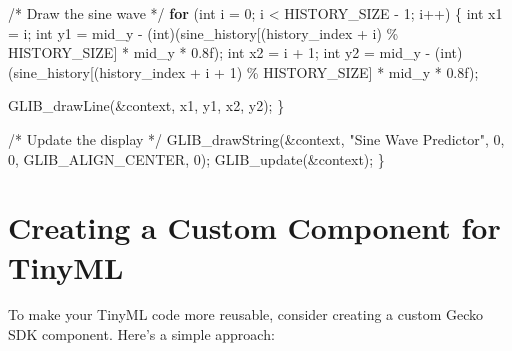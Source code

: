 \documentclass[
  9pt,
  letterpaper,
  abstract,
  titlepage]{scrbook}
\newenvironment{Shaded}{\begin{snugshade}}{\end{snugshade}}
\newcommand{\BuiltInTok}[1]{\textcolor[rgb]{0.00,0.23,0.31}{#1}}
\newcommand{\CommentTok}[1]{\textcolor[rgb]{0.37,0.37,0.37}{#1}}
\newcommand{\ControlFlowTok}[1]{\textcolor[rgb]{0.00,0.23,0.31}{\textbf{#1}}}
\newcommand{\DataTypeTok}[1]{\textcolor[rgb]{0.68,0.00,0.00}{#1}}
\newcommand{\DecValTok}[1]{\textcolor[rgb]{0.68,0.00,0.00}{#1}}
\newcommand{\FloatTok}[1]{\textcolor[rgb]{0.68,0.00,0.00}{#1}}
\newcommand{\NormalTok}[1]{\textcolor[rgb]{0.00,0.23,0.31}{#1}}
\newcommand{\OperatorTok}[1]{\textcolor[rgb]{0.37,0.37,0.37}{#1}}
\newcommand{\StringTok}[1]{\textcolor[rgb]{0.13,0.47,0.30}{#1}}
\begin{document}
\begin{Shaded}
\begin{Highlighting}[]
  \CommentTok{/* Draw the sine wave */}
  \ControlFlowTok{for} \OperatorTok{(}\DataTypeTok{int}\NormalTok{ i }\OperatorTok{=} \DecValTok{0}\OperatorTok{;}\NormalTok{ i }\OperatorTok{\textless{}}\NormalTok{ HISTORY\_SIZE }\OperatorTok{{-}} \DecValTok{1}\OperatorTok{;}\NormalTok{ i}\OperatorTok{++)} \OperatorTok{\{}
    \DataTypeTok{int}\NormalTok{ x1 }\OperatorTok{=}\NormalTok{ i}\OperatorTok{;}
    \DataTypeTok{int}\NormalTok{ y1 }\OperatorTok{=}\NormalTok{ mid\_y }\OperatorTok{{-}} \OperatorTok{(}\DataTypeTok{int}\OperatorTok{)(}\NormalTok{sine\_history}\OperatorTok{[(}\NormalTok{history\_index }\OperatorTok{+}\NormalTok{ i}\OperatorTok{)} \OperatorTok{\%}\NormalTok{ HISTORY\_SIZE}\OperatorTok{]} \OperatorTok{*}\NormalTok{ mid\_y }\OperatorTok{*} \FloatTok{0.8}\BuiltInTok{f}\OperatorTok{);}
    \DataTypeTok{int}\NormalTok{ x2 }\OperatorTok{=}\NormalTok{ i }\OperatorTok{+} \DecValTok{1}\OperatorTok{;}
    \DataTypeTok{int}\NormalTok{ y2 }\OperatorTok{=}\NormalTok{ mid\_y }\OperatorTok{{-}} \OperatorTok{(}\DataTypeTok{int}\OperatorTok{)(}\NormalTok{sine\_history}\OperatorTok{[(}\NormalTok{history\_index }\OperatorTok{+}\NormalTok{ i }\OperatorTok{+} \DecValTok{1}\OperatorTok{)} \OperatorTok{\%}\NormalTok{ HISTORY\_SIZE}\OperatorTok{]} \OperatorTok{*}\NormalTok{ mid\_y }\OperatorTok{*} \FloatTok{0.8}\BuiltInTok{f}\OperatorTok{);}
    
\NormalTok{    GLIB\_drawLine}\OperatorTok{(\&}\NormalTok{context}\OperatorTok{,}\NormalTok{ x1}\OperatorTok{,}\NormalTok{ y1}\OperatorTok{,}\NormalTok{ x2}\OperatorTok{,}\NormalTok{ y2}\OperatorTok{);}
  \OperatorTok{\}}
  
  \CommentTok{/* Update the display */}
\NormalTok{  GLIB\_drawString}\OperatorTok{(\&}\NormalTok{context}\OperatorTok{,} \StringTok{"Sine Wave Predictor"}\OperatorTok{,} \DecValTok{0}\OperatorTok{,} \DecValTok{0}\OperatorTok{,}\NormalTok{ GLIB\_ALIGN\_CENTER}\OperatorTok{,} \DecValTok{0}\OperatorTok{);}
\NormalTok{  GLIB\_update}\OperatorTok{(\&}\NormalTok{context}\OperatorTok{);}
\OperatorTok{\}}
\end{Highlighting}
\end{Shaded}

\section{Creating a Custom Component for
TinyML}\label{creating-a-custom-component-for-tinyml}

To make your TinyML code more reusable, consider creating a custom Gecko
SDK component. Here's a simple approach:
\end{document}
